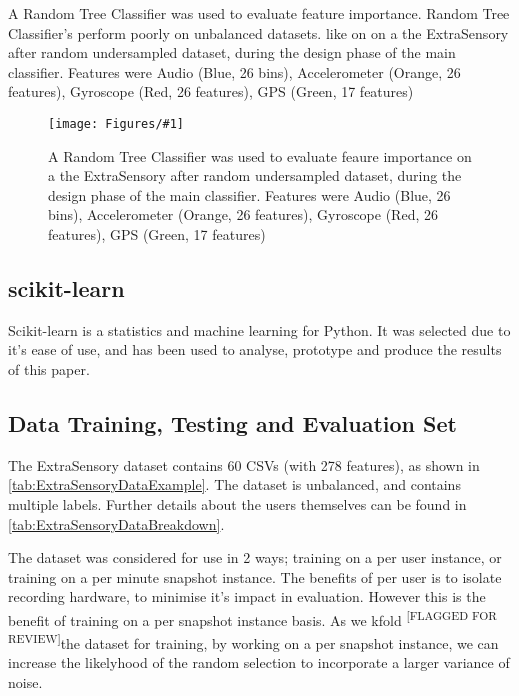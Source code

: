 \documentclass{UoNMCHA}
\newcommand{\flagforreview}{\textsuperscript{\color{red} [FLAGGED FOR REVIEW]}}
\newcommand{\fFigure}[3]{
	\begin{figure}[h]
        \begin{center}  
            \texttt{[image: Figures/\#1]}  
            \caption{#2}
            \label{#1}
        \end{center}
	\end{figure}
}
\numberwithin{equation}{section}
\begin{document}
A Random Tree Classifier was used to evaluate feature importance. Random Tree Classifier's perform poorly on unbalanced datasets. like on  on a the ExtraSensory after random undersampled dataset, during the design phase of the main classifier. Features were Audio (Blue, 26 bins), Accelerometer (Orange, 26 features), Gyroscope (Red, 26 features), GPS (Green, 17 features)

\fFigure{feature_important_just_combined_big_colour.png}{A Random Tree Classifier was used to evaluate feaure importance on a the ExtraSensory after random undersampled dataset, during the design phase of the main classifier. Features were Audio (Blue, 26 bins), Accelerometer (Orange, 26 features), Gyroscope (Red, 26 features), GPS (Green, 17 features)}{1}




\subsection{scikit-learn}

Scikit-learn is a statistics and machine learning for Python. It was selected due to it's ease of use, and has been used to analyse, prototype and produce the results of this paper.




\subsection{Data Training, Testing and Evaluation Set}
The ExtraSensory dataset contains 60 CSVs (with 278 features), as shown in \ref{tab:ExtraSensoryDataExample}. The dataset is unbalanced, and contains multiple labels. Further details about the users themselves can be found in \ref{tab:ExtraSensoryDataBreakdown}.

The dataset was considered for use in 2 ways; training on a per user instance, or training on a per minute snapshot instance. The benefits of per user is to isolate recording hardware, to minimise it's impact in evaluation. However this is the benefit of training on a per snapshot instance basis. As we kfold\flagforreview the dataset for training, by working on a per snapshot instance, we can increase the likelyhood of the random selection to incorporate a larger variance of noise.
\end{document}
